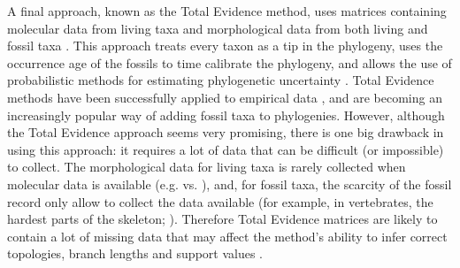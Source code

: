 \documentclass[12pt,letterpaper]{article}
\begin{document}
A final approach, known as the Total Evidence method, uses matrices containing molecular data from living taxa and morphological data from both living and fossil taxa \citep{eernissetaxonomic1993}.  This approach treats every taxon as a tip in the phylogeny, uses the occurrence age of the fossils to time calibrate the phylogeny, and allows the use of probabilistic methods for estimating phylogenetic uncertainty \citep{ronquista2012}. Total Evidence methods have been successfully applied to empirical data \citep{pyrondivergence2011,ronquista2012,schragocombining2013}, and are becoming an increasingly popular way of adding fossil taxa to phylogenies. However, although the Total Evidence approach seems very promising, there is one big drawback in using this approach: it requires a lot of data that can be difficult (or impossible) to collect.
The morphological data for living taxa is rarely collected when molecular data is available (e.g. \citealt{O'Leary08022013} vs. \citealt{meredithimpacts2011}), and, for fossil taxa, the scarcity of the fossil record only allow to collect the data available (for example, in vertebrates, the hardest parts of the skeleton; \citealt{sansomfossilization2013}). Therefore Total Evidence matrices are likely to contain a lot of missing data that may affect the method's ability to infer correct topologies, branch lengths and support values \citep{salamin2003}. 
\end{document}
